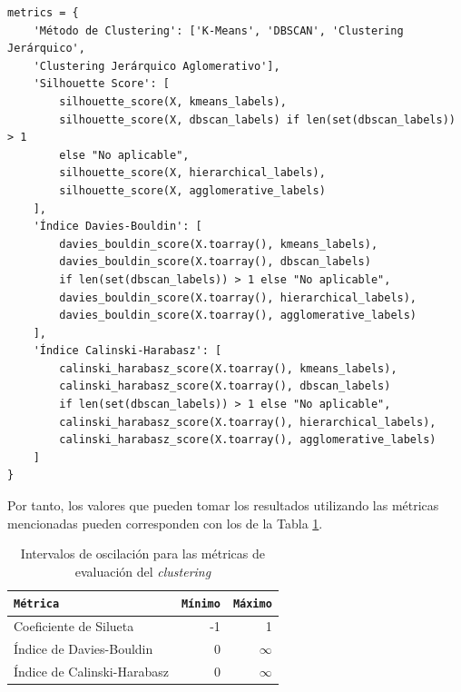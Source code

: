 \begin{center}
    \begin{mdframed}
    \scriptsize
            \begin{verbatim}
metrics = {
    'Método de Clustering': ['K-Means', 'DBSCAN', 'Clustering Jerárquico', 
    'Clustering Jerárquico Aglomerativo'],
    'Silhouette Score': [
        silhouette_score(X, kmeans_labels),
        silhouette_score(X, dbscan_labels) if len(set(dbscan_labels)) > 1 
        else "No aplicable",
        silhouette_score(X, hierarchical_labels),
        silhouette_score(X, agglomerative_labels)
    ],
    'Índice Davies-Bouldin': [
        davies_bouldin_score(X.toarray(), kmeans_labels),
        davies_bouldin_score(X.toarray(), dbscan_labels) 
        if len(set(dbscan_labels)) > 1 else "No aplicable",
        davies_bouldin_score(X.toarray(), hierarchical_labels),
        davies_bouldin_score(X.toarray(), agglomerative_labels)
    ],
    'Índice Calinski-Harabasz': [
        calinski_harabasz_score(X.toarray(), kmeans_labels),
        calinski_harabasz_score(X.toarray(), dbscan_labels) 
        if len(set(dbscan_labels)) > 1 else "No aplicable",
        calinski_harabasz_score(X.toarray(), hierarchical_labels),
        calinski_harabasz_score(X.toarray(), agglomerative_labels)
    ]
}
            \end{verbatim}
    \end{mdframed}
\end{center}

\newpage


Por tanto, los valores que pueden tomar los resultados utilizando las métricas mencionadas pueden corresponden con los de la Tabla \ref{tab:intervalos_metricas}.

\begin{table}[H]
\centering
\footnotesize
\begin{tabularx}{\textwidth}{|X|r|r|}
\hline
\rowcolor{graylight}\texttt{Métrica} & \texttt{Mínimo} & \texttt{Máximo} \\ 
\hline
Coeficiente de Silueta & -1 & 1 \\ 
\hline
Índice de Davies-Bouldin & 0 & $\infty$ \\
\hline
Índice de Calinski-Harabasz & 0 & $\infty$ \\
\hline
\end{tabularx}
\caption{Intervalos de oscilación para las métricas de evaluación del \textit{clustering}}
\label{tab:intervalos_metricas}
\end{table}

